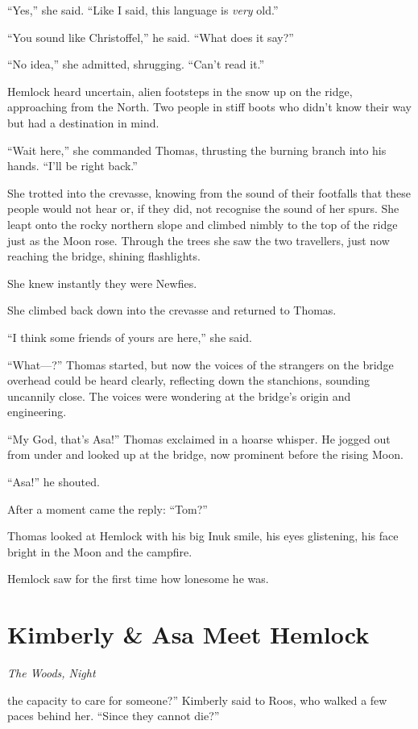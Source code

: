 \documentclass[11pt,a5paper]{article}
\newcommand{\alet}[1]{\textit{#1}\vspace{1em}}
\begin{document}
``Yes,'' she said. ``Like I said, this language is \emph{very} old.''

``You sound like Christoffel,'' he said. ``What does it say?''

``No idea,'' she admitted, shrugging. ``Can't read it.''

Hemlock heard uncertain, alien footsteps in the snow up on the ridge, approaching from the North. Two people in stiff boots who didn't know their way but had a destination in mind.

``Wait here,'' she commanded Thomas, thrusting the burning branch into his hands. ``I'll be right back.''

She trotted into the crevasse, knowing from the sound of their footfalls that these people would not hear or, if they did, not recognise the sound of her spurs. She leapt onto the rocky northern slope and climbed nimbly to the top of the ridge just as the Moon rose. Through the trees she saw the two travellers, just now reaching the bridge, shining flashlights.

She knew instantly they were Newfies.

She climbed back down into the crevasse and returned to Thomas.

``I think some friends of yours are here,'' she said.

``What---?'' Thomas started, but now the voices of the strangers on the bridge overhead could be heard clearly, reflecting down the stanchions, sounding uncannily close. The voices were wondering at the bridge's origin and engineering.

``My God, that's Asa!'' Thomas exclaimed in a hoarse whisper. He jogged out from under and looked up at the bridge, now prominent before the rising Moon.

``Asa!'' he shouted.

After a moment came the reply: ``Tom?''

Thomas looked at Hemlock with his big Inuk smile, his eyes glistening, his face bright in the Moon and the campfire.

Hemlock saw for the first time how lonesome he was.

\newpage

\section{Kimberly \& Asa Meet Hemlock}

\alet{The Woods, Night}

 the capacity to care for someone?'' Kimberly said to Roos, who walked a few paces behind her. ``Since they cannot die?''
\end{document}
